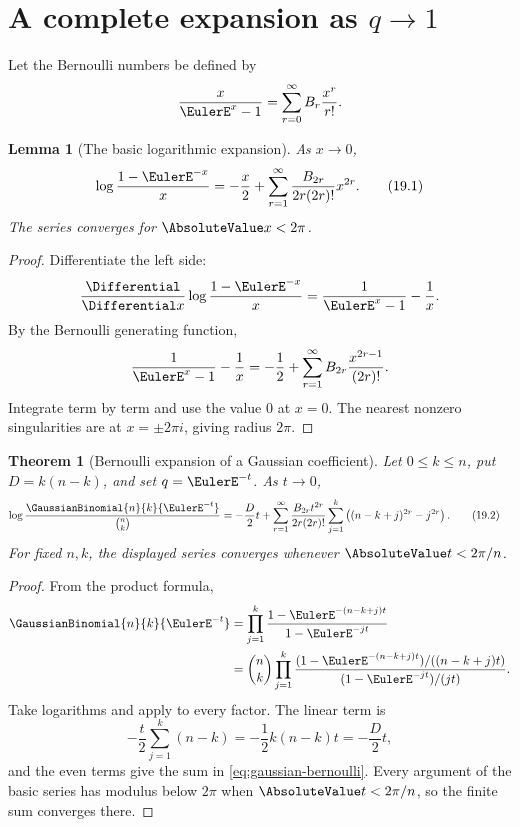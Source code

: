 \documentclass[11pt,a4paper,oneside,openany]{book}
\newtheorem{theorem}{Theorem}[chapter]
\newtheorem{lemma}[lemma]{Lemma}
\theoremstyle{definition}
\theoremstyle{remark}
\begin{document}
\section{A complete expansion as \texorpdfstring{$q\to1$}{q to 1}}

Let the Bernoulli numbers be defined by
\[
 \frac{x}{\EulerE^x-1}=\sum_{r=0}^{\infty}B_r\frac{x^r}{r!}.
\]

\begin{lemma}[The basic logarithmic expansion]\label{lem:basic-bernoulli-log}
As $x\to0$,
\[
 \log\frac{1-\EulerE^{-x}}x
 =-\frac x2+
 \sum_{r=1}^{\infty}
 \frac{B_{2r}}{2r(2r)!}x^{2r}.
 \tag{19.1}\label{eq:basic-bernoulli-log}
\]
The series converges for $\AbsoluteValue x<2\pi$.
\end{lemma}

\begin{proof}
Differentiate the left side:
\[
 \frac{\Differential}{\Differential x}\log\frac{1-\EulerE^{-x}}x
 =\frac1{\EulerE^x-1}-\frac1x.
\]
By the Bernoulli generating function,
\[
 \frac1{\EulerE^x-1}-\frac1x
 =-\frac12+\sum_{r=1}^{\infty}
 B_{2r}\frac{x^{2r-1}}{(2r)!}.
\]
Integrate term by term and use the value $0$ at $x=0$.  The nearest nonzero singularities are at $x=\pm2\pi i$, giving radius $2\pi$.
\end{proof}

\begin{theorem}[Bernoulli expansion of a Gaussian coefficient]\label{thm:gaussian-bernoulli}
Let $0\le k\le n$, put $D=k(n-k)$, and set $q=\EulerE^{-t}$.  As $t\to0$,
\begin{align}
 \log\frac{\GaussianBinomial{n}{k}{\EulerE^{-t}}}{\binom nk}
 =-&\frac D2t
 +\sum_{r=1}^{\infty}
 \frac{B_{2r}t^{2r}}{2r(2r)!}
 \sum_{j=1}^{k}
 \left((n-k+j)^{2r}-j^{2r}\right).
 \tag{19.2}\label{eq:gaussian-bernoulli}
\end{align}
For fixed $n,k$, the displayed series converges whenever $\AbsoluteValue t<2\pi/n$.
\end{theorem}

\begin{proof}
From the product formula,
\begin{align*}
 \GaussianBinomial{n}{k}{\EulerE^{-t}}
 &=\prod_{j=1}^{k}
 \frac{1-\EulerE^{-(n-k+j)t}}{1-\EulerE^{-jt}}\\
 &=\binom nk
 \prod_{j=1}^{k}
 \frac{(1-\EulerE^{-(n-k+j)t})/((n-k+j)t)}
      {(1-\EulerE^{-jt})/(jt)}.
\end{align*}
Take logarithms and apply  to every factor.  The linear term is
\[
 -\frac t2\sum_{j=1}^{k}(n-k)=-\frac12k(n-k)t=-\frac D2t,
\]
and the even terms give the sum in \eqref{eq:gaussian-bernoulli}.  Every argument of the basic series has modulus below $2\pi$ when $\AbsoluteValue t<2\pi/n$, so the finite sum converges there.
\end{proof}
\end{document}
